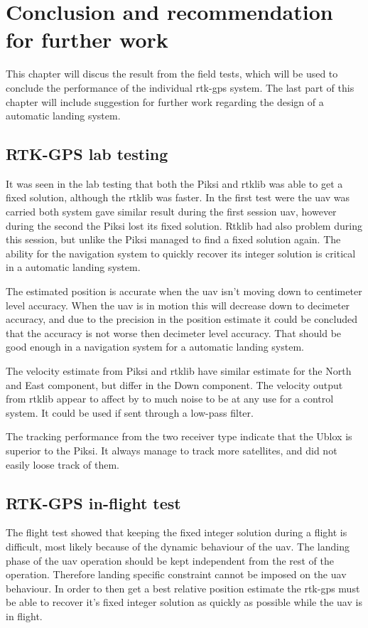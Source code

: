 
\chapter{Conclusion and recommendation for further work}
This chapter will discus the result from the field tests, which will be used to conclude the performance of the individual \gls{rtk-gps} system. The last part of this chapter will include suggestion for further work regarding the design of a automatic landing system.
\section{RTK-GPS lab testing}
It was seen in the lab testing that both the Piksi and \gls{rtklib} was able to get a fixed solution, although the \gls{rtklib} was faster. In the first test were the \gls{uav} was carried both system gave similar result during the first session \gls{uav}, however during the second the Piksi lost its fixed solution. Rtklib had also problem during this session, but unlike the Piksi managed to find a fixed solution again. The ability for the navigation system to quickly recover its integer solution is critical in a automatic landing system.


The estimated position is accurate when the \gls{uav} isn't moving down to centimeter level accuracy. When the \gls{uav} is in motion this will decrease down to decimeter accuracy, and due to the precision in the position estimate it could be concluded that the accuracy is not worse then decimeter level accuracy. That should be good enough in a navigation system for a automatic landing system.

The velocity estimate from Piksi and \gls{rtklib} have similar estimate for the North and East component, but differ in the Down component. The velocity output from \gls{rtklib} appear to affect by to much noise to be at any use for a control system. It could be used if sent through a low-pass filter.

The tracking performance from the two receiver type indicate that the Ublox is superior to the Piksi. It always manage to track more satellites, and did not easily loose track of them.
\section{RTK-GPS in-flight test}
The flight test showed that keeping the fixed integer solution during a flight is difficult, most likely because of the dynamic behaviour of the \gls{uav}. The landing phase of the \gls{uav} operation should be kept independent from the rest of the operation. Therefore landing specific constraint cannot be imposed on the \gls{uav} behaviour. In order to then get a best relative position estimate the \gls{rtk-gps} must be able to recover it's fixed integer solution as quickly as possible while the \gls{uav} is in flight.

